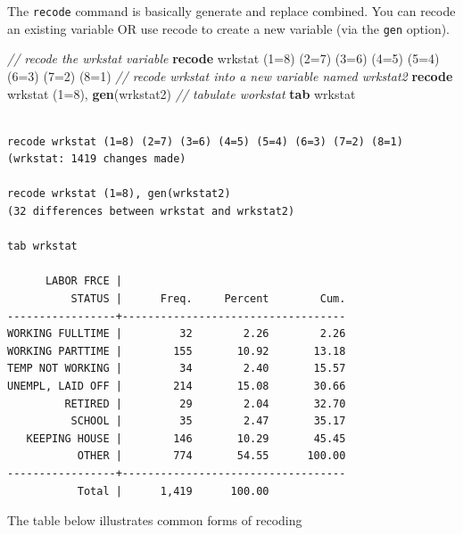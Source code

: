 \documentclass[]{book}
\newenvironment{Shaded}{\begin{snugshade}}{\end{snugshade}}
\newcommand{\CommentTok}[1]{\textcolor[rgb]{0.56,0.35,0.01}{\textit{#1}}}
\newcommand{\KeywordTok}[1]{\textcolor[rgb]{0.13,0.29,0.53}{\textbf{#1}}}
\newcommand{\NormalTok}[1]{#1}
\begin{document}
The \texttt{recode} command is basically generate and replace combined. You can recode an existing variable OR use recode to create a new variable (via the \texttt{gen} option).

\begin{Shaded}
\begin{Highlighting}[]
  \CommentTok{// recode the wrkstat variable }
  \KeywordTok{recode}\NormalTok{ wrkstat (1=8) (2=7) (3=6) (4=5) (5=4) (6=3) (7=2) (8=1)}
  \CommentTok{// recode wrkstat into a new variable named wrkstat2}
  \KeywordTok{recode}\NormalTok{ wrkstat (1=8), }\KeywordTok{gen}\NormalTok{(wrkstat2)}
  \CommentTok{// tabulate workstat}
  \KeywordTok{tab}\NormalTok{ wrkstat}
\end{Highlighting}
\end{Shaded}

\begin{verbatim}

recode wrkstat (1=8) (2=7) (3=6) (4=5) (5=4) (6=3) (7=2) (8=1)
(wrkstat: 1419 changes made)

recode wrkstat (1=8), gen(wrkstat2)
(32 differences between wrkstat and wrkstat2)

tab wrkstat

      LABOR FRCE |
          STATUS |      Freq.     Percent        Cum.
-----------------+-----------------------------------
WORKING FULLTIME |         32        2.26        2.26
WORKING PARTTIME |        155       10.92       13.18
TEMP NOT WORKING |         34        2.40       15.57
UNEMPL, LAID OFF |        214       15.08       30.66
         RETIRED |         29        2.04       32.70
          SCHOOL |         35        2.47       35.17
   KEEPING HOUSE |        146       10.29       45.45
           OTHER |        774       54.55      100.00
-----------------+-----------------------------------
           Total |      1,419      100.00
\end{verbatim}

The table below illustrates common forms of recoding
\end{document}
